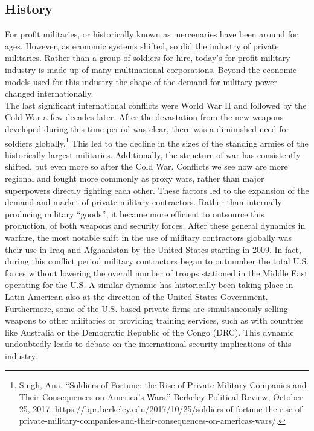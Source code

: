 \documentclass[10pt, letterpaper]{article}
\begin{document}
\subsection{History}

For profit militaries, or historically known as mercenaries have been
around for ages. However, as economic systems shifted, so did the
industry of private militaries. Rather than a group of soldiers for
hire, today's for-profit military industry is made up of many
multinational corporations. Beyond the economic models used for this
industry the shape of the demand for military power changed
internationally. \\

The last significant international conflicts were World War II and
followed by the Cold War a few decades later. After the devastation from
the new weapons developed during this time period was clear, there was a
diminished need for soldiers globally.\footnote{Singh, Ana. ``Soldiers
  of Fortune: the Rise of Private Military Companies and Their
  Consequences on America's Wars.'' Berkeley Political Review, October
  25, 2017.
  https://bpr.berkeley.edu/2017/10/25/soldiers-of-fortune-the-rise-of-private-military-companies-and-their-consequences-on-americas-wars/.}
This led to the decline in the sizes of the standing armies of the
historically largest militaries. Additionally, the structure of war has
consistently shifted, but even more so after the Cold War. Conflicts we
see now are more regional and fought more commonly as proxy wars, rather
than major superpowers directly fighting each other. These factors led
to the expansion of the demand and market of private military
contractors. Rather than internally producing military ``goods'', it
became more efficient to outsource this production, of both weapons and
security forces. After these general dynamics in warfare, the most
notable shift in the use of military contractors globally was their use
in Iraq and Afghanistan by the United States starting in 2009. In fact,
during this conflict period military contractors began to outnumber the
total U.S. forces without lowering the overall number of troops
stationed in the Middle East operating for the U.S. A similar dynamic
has historically been taking place in Latin American also at the
direction of the United States Government. Furthermore, some of the U.S.
based private firms are simultaneously selling weapons to other
militaries or providing training services, such as with countries like
Australia or the Democratic Republic of the Congo (DRC). This dynamic
undoubtedly leads to debate on the international security implications
of this industry. \\
\end{document}
